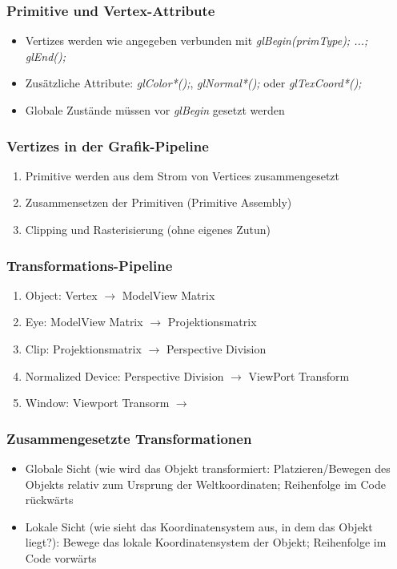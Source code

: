 \subsubsection{Primitive und Vertex-Attribute}
\begin{itemize}
	\item Vertizes werden wie angegeben verbunden mit \textit{glBegin(primType); ...; glEnd();}
	\item Zusätzliche Attribute: \textit{glColor*();}, \textit{glNormal*();} oder \textit{glTexCoord*();}
	\item Globale Zustände müssen vor \textit{glBegin} gesetzt werden
\end{itemize}

\subsubsection{Vertizes in der Grafik-Pipeline}
\begin{enumerate}
	\item Primitive werden aus dem Strom von Vertices zusammengesetzt
	\item Zusammensetzen der Primitiven (Primitive Assembly)
	\item Clipping und Rasterisierung (ohne eigenes Zutun)
\end{enumerate}

\subsubsection{Transformations-Pipeline}
\begin{enumerate}
	\item Object: Vertex \(\rightarrow\) ModelView Matrix
	\item Eye: ModelView Matrix \(\rightarrow\) Projektionsmatrix
	\item Clip: Projektionsmatrix \(\rightarrow\) Perspective Division
	\item Normalized Device: Perspective Division \(\rightarrow\) ViewPort Transform
	\item Window: Viewport Transorm \(\rightarrow\)
\end{enumerate}

\subsubsection{Zusammengesetzte Transformationen}
\begin{itemize}
	\item Globale Sicht (wie wird das Objekt transformiert: Platzieren/Bewegen des Objekts relativ zum Ursprung der Weltkoordinaten; Reihenfolge im Code rückwärts
	\item Lokale Sicht (wie sieht das Koordinatensystem aus, in dem das Objekt liegt?): Bewege das lokale Koordinatensystem der Objekt; Reihenfolge im Code vorwärts
\end{itemize}

